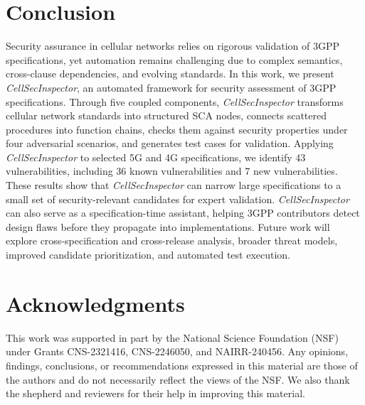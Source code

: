 \documentclass[sigconf]{acmart}
\newcommand{\lm}{\textit{CellSecInspector}\xspace}
\begin{document}
{\section{Conclusion}
\noindent Security assurance in cellular networks relies on rigorous validation of 3GPP specifications, yet automation remains challenging due to complex semantics, cross-clause dependencies, and evolving standards. In this work, we present \lm, an automated framework for security assessment of 3GPP specifications. Through five coupled components, \lm transforms cellular network standards into structured SCA nodes, connects scattered procedures into function chains, checks them against security properties under four adversarial scenarios, and generates test cases for validation. Applying \lm to selected 5G and 4G specifications, we identify 43 vulnerabilities, including 36 known vulnerabilities and 7 new vulnerabilities. These results show that \lm can narrow large specifications to a small set of security-relevant candidates for expert validation. \lm can also serve as a specification-time assistant, helping 3GPP contributors detect design flaws before they propagate into implementations. Future work will explore cross-specification and cross-release analysis, broader threat models, improved candidate prioritization, and automated test execution.

\section{Acknowledgments}
This work was supported in part by the National Science Foundation (NSF) under Grants CNS-2321416, CNS-2246050, and NAIRR-240456. Any opinions, findings, conclusions, or recommendations expressed in this material are those of the authors and do not necessarily reflect the views of the NSF. We also thank the shepherd and reviewers for their help in improving this material.



}
\end{document}
